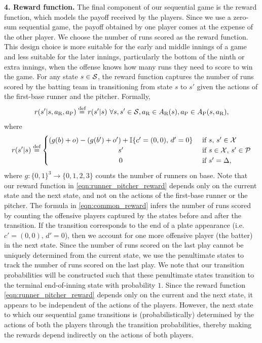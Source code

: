 \documentclass[11pt]{article}
\newcommand{\defeq}{\stackrel{\text{def}}{=}}
\begin{document}
    {\bf 4. Reward function.} The final component of our sequential game is the reward function, which models the payoff received by the players. Since we use a  zero-sum sequential game, the payoff obtained by one player comes at the expense of the other player. We choose the number of runs scored as the reward function. This design choice is more suitable for the early and middle innings of a game and less suitable for the later innings, particularly the bottom of the ninth or extra innings, when the offense knows how many runs they need to score to win the game. For any state $s \in {\cal S}$, the reward function captures the number of runs scored by the batting team in transitioning from state $s$ to $s'$ given the actions of the first-base runner and the pitcher. Formally,
    \begin{align}
      \label{eqn:runner_pitcher_reward}
        r(s'|s,a_\text{R},a_\text{P}) \defeq r(s'|s) \ \forall s,s' \in {\cal S}, a_\text{R} \in A_\text{R}(s), a_\text{P} \in A_\text{P}(s,a_\text{R}),
    \end{align}
    where
    \begin{align}
      \label{eqn:common_reward}
      r(s'|s) \defeq  \begin{cases}
          (g(b) + o) - (g(b') + o') + \mathbb{I}\{c' = (0, 0),\, d' = 0\} & \mbox{ if } s,\, s' \in \mathcal{X}\\
          \hfil s' & \text{ if } s \in \mathcal{X},\, s' \in \mathcal{P}\\
          \hfil 0 & \text{ if } s' = \Delta,
      \end{cases} 
    \end{align}
    where $g: \{0, 1\}^3 \rightarrow \{0, 1, 2, 3\}$ counts the number of runners on base. Note that our reward function in \eqref{eqn:runner_pitcher_reward} depends only on the current state and the next state, and not on the actions of the first-base runner or the pitcher. The formula in \eqref{eqn:common_reward} infers the number of runs scored by counting the offensive players captured by the states before and after the transition. If the transition corresponds to the end of a plate appearance (i.e. $c' = (0, 0),\, d' = 0$), then we account for one more offensive player (the batter) in the next state. Since the number of runs scored on the last play cannot be uniquely determined from the current state, we use the penultimate states to track the number of runs scored on the last play. We note that our transition probabilities will be constructed such that these penultimate states transition to the terminal end-of-inning state with probability $1$. Since the reward function \eqref{eqn:runner_pitcher_reward} depends only on the current and the next state, it appears to be independent of the actions of the players. However, the next state to which our sequential game transitions is (probabilistically) determined by the actions of both the players through the transition probabilities, thereby making the rewards depend indirectly on the actions of both players.
\end{document}
